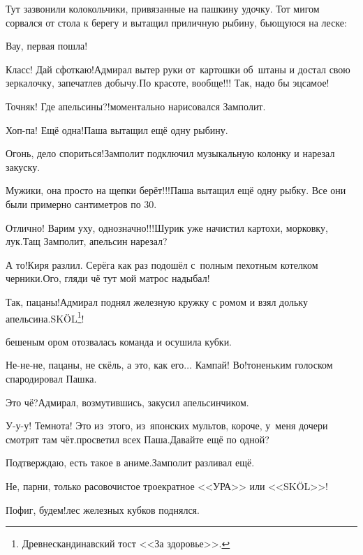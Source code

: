 Тут зазвонили колокольчики, привязанные на пашкину удочку. Тот мигом сорвался от стола к берегу и вытащил приличную рыбину, бьющуюся на леске:

\diagdash Вау, первая пошла!

\diagdash Класс! Дай сфоткаю!\mdash Адмирал вытер руки от~картошки об~штаны и достал свою зеркалочку, запечатлев добычу.\mdash По красоте, вообще!!! Так, надо бы эц\sdash самое!

\diagdash Точняк! Где апельсины?!\mdash моментально нарисовался Замполит.

\diagdash Хоп-па! Ещё одна!\mdash Паша вытащил ещё одну рыбину.

\diagdash Огонь, дело спориться!\mdash Замполит подключил музыкальную колонку и нарезал закуску.

\diagdash Мужики, она просто на щепки берёт!!!\mdash Паша вытащил ещё одну рыбку. Все они были примерно сантиметров по 30.

\diagdash Отлично! Варим уху, однозначно!!!\mdash Шурик уже начистил картохи, морковку, лук.\mdash Тащ Замполит, апельсин нарезал?

\diagdash А то!\mdash Киря разлил. Серёга как раз подошёл с~полным пехотным котелком черники.\mdash Ого, гляди чё тут мой матрос надыбал!

\renewcommand*{\thefootnote}{\fnsymbol{footnote}}
\setcounter{footnote}{0}
\diagdash Так, пацаны!\mdash Адмирал поднял железную кружку с ромом и взял дольку апельсина.\mdash SK{\"O}L{\footnote{Древнескандинавский тост <<За здоровье>>.}}!

\mdash бешеным ором отозвалась команда и осушила кубки.

\diagdash Не-не-не, пацаны, не скёль, а это, как его$\ldots$ Кампай! Во!\mdash тоненьким голоском спародировал Пашка. 

\diagdash Это чё?\mdash Адмирал, возмутившись, закусил апельсинчиком.

\diagdash У-у-у! Темнота! Это из~этого, из~японских мультов, короче, у~меня дочери смотрят там чёт.\mdash просветил всех Паша.\mdash Давайте ещё по одной?

\diagdash Подтверждаю, есть такое в аниме.\mdash Замполит разливал ещё.

\diagdash Не, парни, только расово\sdash чистое троекратное <<УРА>> или <<SK{\"O}L>>! 

\diagdash Пофиг, будем!\mdash лес железных кубков поднялся.

